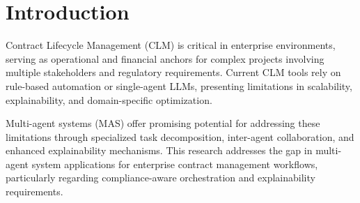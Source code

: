 
\section{Introduction}\label{section:introduction}

Contract Lifecycle Management (CLM) is critical in enterprise environments, serving as operational and financial anchors for complex projects involving multiple stakeholders and regulatory requirements. Current CLM tools rely on rule-based automation or single-agent LLMs, presenting limitations in scalability, explainability, and domain-specific optimization.

Multi-agent systems (MAS) offer promising potential for addressing these limitations through specialized task decomposition, inter-agent collaboration, and enhanced explainability mechanisms. This research addresses the gap in multi-agent system applications for enterprise contract management workflows, particularly regarding compliance-aware orchestration and explainability requirements.
